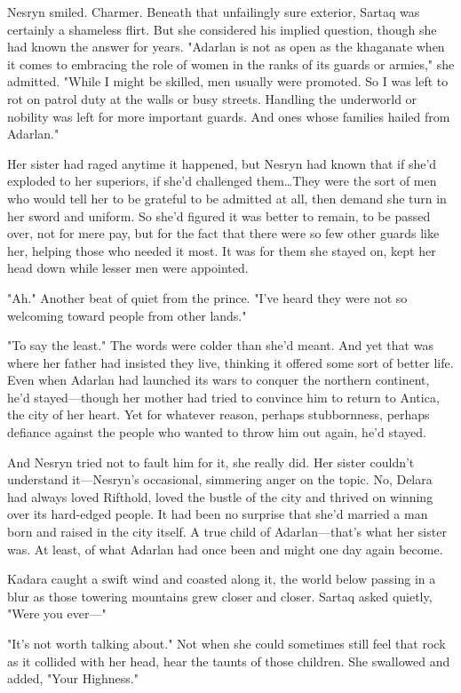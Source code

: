 Nesryn smiled.
Charmer.
Beneath that unfailingly sure exterior, Sartaq was certainly a shameless flirt.
But she considered his implied question, though she had known the answer for years.
"Adarlan is not as  open as the khaganate when it comes to embracing the role of women in the ranks of its guards or armies," she admitted.
"While I might be skilled, men usually were promoted.
So I was left to rot on patrol duty at the walls or busy streets.
Handling the underworld or nobility was left for more important guards.
And ones whose families hailed from Adarlan."

Her sister had raged anytime it happened, but Nesryn had known that if she'd exploded to her superiors, if she'd challenged them\ldots They were the sort of men who would tell her to be grateful to be admitted at all, then demand she turn in her sword and uniform.
So she'd figured it was better to remain, to be passed over, not for mere pay, but for the fact that there were so few other guards like her, helping those who needed it most.
It was for them she stayed on, kept her head down while lesser men were appointed.

"Ah."
Another beat of quiet from the prince.
"I've heard they were not so welcoming toward people from other lands."

"To say the least."
The words were colder than she'd meant.
And yet that was where her father had insisted they live, thinking it offered some sort of better life.
Even when Adarlan had launched its wars to conquer the northern continent, he'd stayed---though her mother had tried to convince him to return to Antica, the city of her heart.
Yet for whatever reason, perhaps stubbornness, perhaps defiance against the people who wanted to throw him out again, he'd stayed.

And Nesryn tried not to fault him for it, she really did.
Her sister couldn't understand it---Nesryn's occasional, simmering anger on the topic.
No, Delara had always loved Rifthold, loved the bustle of the city and thrived on winning over its hard-edged people.
It had been no surprise that she'd married a man born and raised in the city itself.
A true child of Adarlan---that's what her sister was.
At least, of what Adarlan had once been and might one day again become.

Kadara caught a swift wind and coasted along it, the world below passing in a blur as those towering mountains grew closer and closer.
Sartaq asked quietly, "Were you ever---"

"It's not worth talking about."
Not when she could sometimes still feel that rock as it collided with her head, hear the taunts of those children.
She swallowed and added, "Your Highness."

